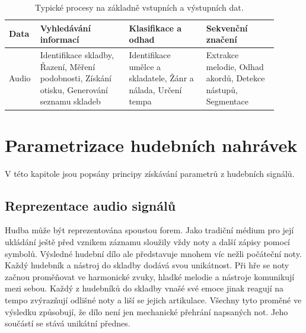   \begin{table}[H]
    \centering
    \begin{tabular}{|p{0.07\linewidth} | p{0.31\linewidth} | p{0.27\linewidth} | p{0.25\linewidth}|}
        \hline
        {\bf Data}                 & {\bf Vyhledávání informací} & {\bf Klasifikace a odhad} & {\bf Sekvenční značení}\\
        \hline
        Audio                      & Identifikace skladby,
                                     Řazení,
                                     Měření podobnosti,
                                     Získání otisku,
                                     Generování seznamu skladeb
                                   & Identifikace umělce a skladatele,
                                     Žánr a nálada,
                                     Určení tempa
                                   & Extrakce melodie,
                                     Odhad akordů,
                                     Detekce nástupů,
                                     Segmentace                   \\
        \hline
    \end{tabular}
    \caption{Typické procesy na základně vstupních a výstupních dat.}
    \label{tab:MIR_typicke_procesy}
  \end{table}



  \section{Parametrizace hudebních nahrávek}
  V této kapitole jsou popsány principy získávání parametrů z hudebních signálů.
  \cite{fundamental_of_music_processing}


  \subsection{Reprezentace audio signálů}
  Hudba může být reprezentována spoustou forem. 
  Jako tradiční médium pro její ukládání ještě před vznikem záznamu sloužily vždy noty a další zápisy pomocí symbolů.
  Výsledné hudební dílo ale představuje mnohem víc nežli počáteční noty.
  Každý hudebník a nástroj do skladby dodává svou unikátnost.
  Při hře se noty začnou proměňovat ve harmonické zvuky, hladké melodie a nástroje komunikují mezi sebou. 
  Každý z hudebníků do skladby vnašé své emoce jinak reagují na tempo zvýrazňují odlišné noty a liší se jejich artikulace.
  Všechny tyto proměné ve výsledku způsobují, že dílo není jen mechanické přehrání napsaných not.
  Jeho součástí se stává unikátní přednes.

